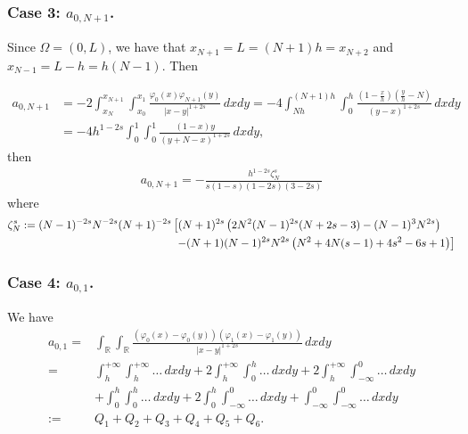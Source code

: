 \documentclass[10 pt]{article}
\numberwithin{equation}{section}
\newcommand{\RR}{\mathbb{R}}
\begin{document}
\subsubsection{Case 3: $a_{0,N+1}$.} Since $\Omega=(0,L)$, we have that $x_{N+1}=L=(N+1)h=x_{N+2}$ and $x_{N-1}=L-h=h(N-1)$. Then

\begin{align*}
a_{0,N+1}&=-2 \int_{x_{N}}^{x_{N+1}}\int_{x_0}^{x_1}\frac{\varphi_0(x)\varphi_{N+1}(y)}{|x-y|^{1+2s}}\,dxdy
=-4\int_{Nh}^{(N+1)h}\int_0^{h}\frac{\left(1-\frac{x}{h}\right)\left(\frac{y}{h}-N\right)}{(y-x)^{1+2s}}\,dxdy\\
&=-4h^{1-2s}\int_{0}^{1}\int_0^{1}\frac{\left(1-x\right)y}{(y+N-x)^{1+2s}}\,dxdy,
\end{align*}
then
%
\begin{align*}
a_{0,N+1} = -\frac{h^{1-2 s} \zeta_N^s }{s(1-s)(1-2s )(3-2 s)}
\end{align*}
%
where 
%
\begin{align}\notag 
\zeta_N^s:= (N-1)^{-2 s} N^{-2 s} (N+1)^{-2 s}
   &\left[(N+1)^{2 s} \left(2 N^2 (N-1)^{2 s} (N+2 s-3)-(N-1)^3
   N^{2 s}\right) \right. \\  & \label{eq:def_zeta_N} \;
   \left. -(N+1) (N-1)^{2 s} N^{2 s} \left(N^2+4 N (s-1)+4
   s^2-6 s+1\right)\right]
\end{align}
%


\subsubsection{Case 4: $a_{0,1}$.}

We have 
	\begin{align*}
	a_{0,1}= & \int_{\RR}\int_{\RR}\frac{(\varphi_0(x)-\varphi_0(y))(\varphi_{1}(x)-\varphi_{1}(y))}{|x-y|^{1+2s}}\,dxdy
	\\
	= & \int_{h}^{+\infty}\int_{h}^{+\infty} \ldots\,dxdy + 2\int_{h}^{+\infty}\int_{0}^{h} \ldots\,dxdy + 2\int_{h}^{+\infty}\int_{-\infty}^{0} \ldots\,dxdy 
	\\
	& + \int_{0}^{h}\int_{0}^{h} \ldots\,dxdy + 2\int_{0}^{h}\int_{-\infty}^{0} \ldots\,dxdy + \int_{-\infty}^{0}\int_{-\infty}^{0} \ldots\,dxdy 
	\\
	:= & Q_1 + Q_2 + Q_3 + Q_4 + Q_5 + Q_6.
\end{align*}
\end{document}
